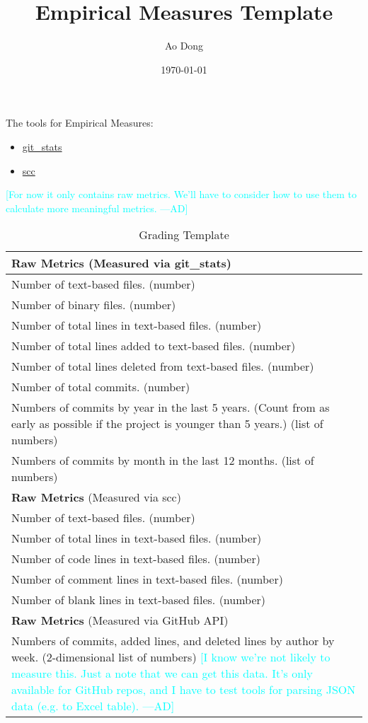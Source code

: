 \documentclass[12pt]{article}
\newcommand{\authornote}[3]{\textcolor{#1}{[#3 ---#2]}}
\newcommand{\authornote}[3]{}
\newcommand{\ad}[1]{\authornote{cyan}{AD}{#1}} %
\begin{document}
\title{Empirical Measures Template} 
\author{Ao Dong}
\date{\today}
	
\maketitle

The tools for Empirical Measures:
\begin{itemize}
\item \href{https://github.com/tomgi/git_stats}{git\_stats}
\item \href{https://github.com/boyter/scc}{scc}
\end{itemize}

\ad{For now it only contains raw metrics. We'll have to consider how to use them to calculate more meaningful metrics.}

\begin{longtable}{p{16cm}}
  \caption{Grading Template}   \label{table:TemplateFull}\\
  \toprule
  \textbf{Raw Metrics} (Measured via git\_stats)\\
  \midrule
  Number of text-based files. (number)\\
  Number of binary files. (number)\\
  Number of total lines in text-based files. (number)\\
  Number of total lines added to text-based files. (number)\\
  Number of total lines deleted from text-based files. (number)\\
  Number of total commits. (number)\\
Numbers of commits by year in the last 5 years. (Count from as early as possible
if the project is younger than 5 years.) (list of numbers)\\
  Numbers of commits by month in the last 12 months. (list of numbers)\\
  
  \midrule
  \textbf{Raw Metrics} (Measured via scc)\\
  \midrule
  Number of text-based files. (number)\\
  Number of total lines in text-based files. (number)\\
  Number of code lines in text-based files. (number)\\
  Number of comment lines in text-based files. (number)\\
  Number of blank lines in text-based files. (number)\\

  \midrule
  \textbf{Raw Metrics} (Measured via GitHub API)\\
  \midrule
Numbers of commits, added lines, and deleted lines by author by week.
(2-dimensional list of numbers) \ad{I know we're not likely to measure this.
Just a note that we can get this data. It's only available for GitHub repos, and
I have to test tools for parsing JSON data (e.g. to Excel table).}\\
  \bottomrule

\end{longtable}
\end{document}
